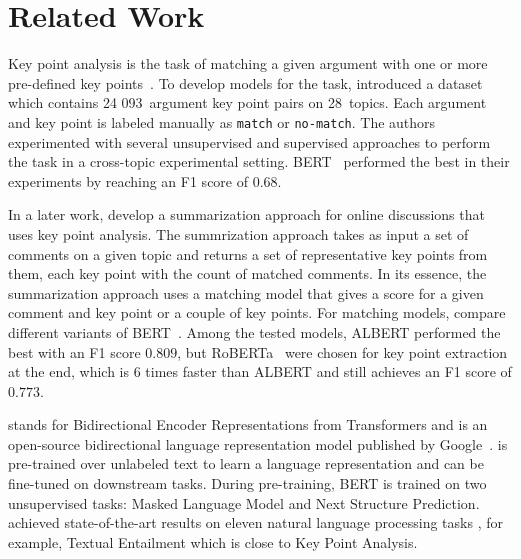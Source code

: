\section{Related Work}\label{related-work}


Key point analysis is the task of matching a given argument with one or more pre-defined key points~\cite{Bar-HaimEFKLS2020}. To develop models for the task, \citet{Bar-HaimEFKLS2020} introduced a dataset \ArgKP which contains 24 093~argument key point pairs on 28~topics. Each argument and key point is labeled manually as \texttt{match} or \texttt{no-match}. The authors experimented with several unsupervised and supervised approaches to perform the task in a cross-topic experimental setting. BERT~\cite{DevlinCLT2019} performed the best in their experiments by reaching an F1 score of $0.68$.

In a later work, \citet{Bar-HaimKEFLS2020} develop a summarization approach for online discussions that
uses key point analysis. The summrization approach takes as input a set of comments on a given topic and returns a set of representative key points from them, each key point with the count of matched comments. In its essence, the summarization approach uses a matching model that gives a score for a given comment and key point or a couple of key points. For matching models, \citet{Bar-HaimKEFLS2020} compare different variants of BERT~\cite{DevlinCLT2019}. Among the tested models,
ALBERT \cite{lan2019albert} performed the best with an F1 score $0.809$, but RoBERTa~\cite{LiuOGDJCLLZS2019} were chosen for key point extraction at the end, which is 6 times faster than ALBERT and still achieves an F1 score of $0.773$. 

\Bert stands for Bidirectional Encoder Representations from Transformers and is an open-source bidirectional language representation model published by Google~\cite{DevlinCLT2019}. 
\Bert is pre-trained over unlabeled text to learn a language representation and can be fine-tuned on downstream tasks. During pre-training, BERT is trained on two unsupervised tasks: Masked Language Model and Next Structure Prediction. \Bert achieved state-of-the-art results on eleven natural language processing tasks \cite{WangSMHLB2018}, for example, Textual Entailment which is close to Key Point Analysis.

